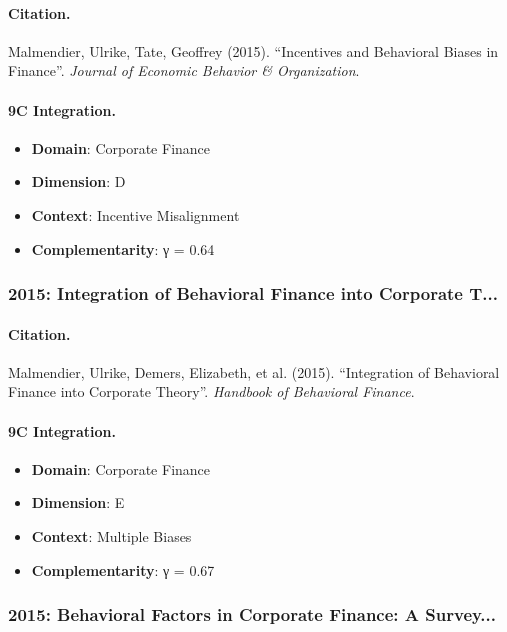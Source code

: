 \paragraph{Citation.}
Malmendier, Ulrike, Tate, Geoffrey (2015). ``Incentives and Behavioral Biases in Finance''. \textit{Journal of Economic Behavior & Organization}.

\paragraph{9C Integration.}
\begin{itemize}[nosep]
  \item \textbf{Domain}: Corporate Finance
  \item \textbf{Dimension}: D
  \item \textbf{Context}: Incentive Misalignment
  \item \textbf{Complementarity}: γ = 0.64
\end{itemize}


\subsubsection{2015: Integration of Behavioral Finance into Corporate T...}

\paragraph{Citation.}
Malmendier, Ulrike, Demers, Elizabeth, et al. (2015). ``Integration of Behavioral Finance into Corporate Theory''. \textit{Handbook of Behavioral Finance}.

\paragraph{9C Integration.}
\begin{itemize}[nosep]
  \item \textbf{Domain}: Corporate Finance
  \item \textbf{Dimension}: E
  \item \textbf{Context}: Multiple Biases
  \item \textbf{Complementarity}: γ = 0.67
\end{itemize}


\subsubsection{2015: Behavioral Factors in Corporate Finance: A Survey...}

